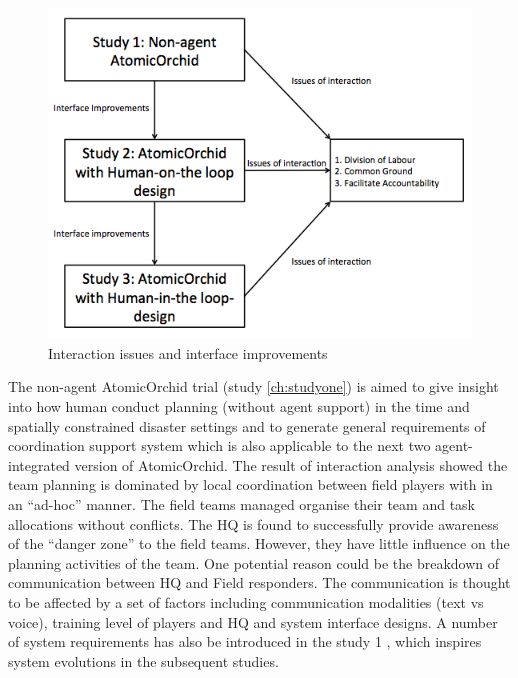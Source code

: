 \begin{figure}[h]
  \centering
  \includegraphics[width=1\textwidth]{img/conclusion/connections}
  \caption{ Interaction issues and interface improvements}
  \label{fig:connections}
\end{figure}

The non-agent AtomicOrchid trial (study \ref{ch:studyone}) is aimed to give insight into how human conduct planning (without agent support) in the time and spatially constrained disaster settings and to generate general requirements of coordination support system which is also applicable to the next two agent-integrated version of AtomicOrchid. The result of interaction analysis showed the team planning is dominated by local coordination between field players with in an ``ad-hoc'' manner. The field teams managed organise their team and task allocations without conflicts. The HQ is found to successfully provide awareness of the ``danger zone'' to the field teams. However, they have little influence on the planning activities of the team. One potential reason could be the breakdown of communication between HQ and Field responders. The communication is thought to be affected by a set of factors including communication modalities (text vs voice), training level of players and HQ and system interface designs. A number of system requirements has also be introduced in the study 1 , which inspires system evolutions in the subsequent studies. \\


